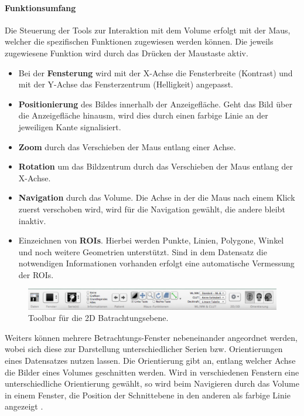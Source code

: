 \paragraph{Funktionsumfang}
Die Steuerung der Tools zur Interaktion mit dem Volume erfolgt mit der Maus, 
welcher die spezifischen Funktionen zugewiesen werden können. Die jeweils zugewiesene Funktion wird durch das Drücken der Maustaste aktiv.
\begin{itemize}
	\item Bei der \textbf{Fensterung} wird mit der X-Achse die Fensterbreite (Kontrast) und mit der Y-Achse das Fensterzentrum (Helligkeit) angepasst.
	\item \textbf{Positionierung} des Bildes innerhalb der Anzeigefläche. Geht das Bild über die Anzeigefläche hinausm, wird dies durch einen farbige Linie an der jeweiligen Kante signalisiert.
	\item \textbf{Zoom} durch das Verschieben der Maus entlang einer Achse.
	\item \textbf{Rotation} um das Bildzentrum durch das Verschieben  der Maus entlang der X-Achse.
	\item \textbf{Navigation} durch das Volume. Die Achse in der die Maus nach einem Klick zuerst verschoben wird, wird für die Navigation gewählt, die andere bleibt inaktiv.
	\item Einzeichnen von \textbf{ROIs}. Hierbei werden Punkte, Linien, Polygone, Winkel und noch weitere Geometrien unterstützt. 
		Sind in dem Datensatz die notwendigen Informationen vorhanden erfolgt eine automatische Vermessung der ROIs.
\end{itemize}
\begin{figure}[t]
	\centering
	\includegraphics[width=0.8\linewidth]{img/c2_osirix_2d_view_toolbar.jpg}
	\caption{Toolbar für die 2D Batrachtungsebene.}
	\label{fig:osiri_2dView_toolbar}
\end{figure}
Weiters können mehrere Betrachtungs-Fenster nebeneinander angeordnet werden, wobei sich diese zur Darstellung unterschiedlicher Serien bzw. Orientierungen eines Datensatzes nutzen lassen. 
Die Orientierung gibt an, 
entlang welcher Achse die Bilder eines Volumes geschnitten werden.
Wird in verschiedenen Fenstern eine unterschiedliche Orientierung gewählt,
so wird beim Navigieren durch das Volume in einem Fenster, 
die Position der Schnittebene in den anderen als farbige Linie angezeigt \cite{osirix}.
